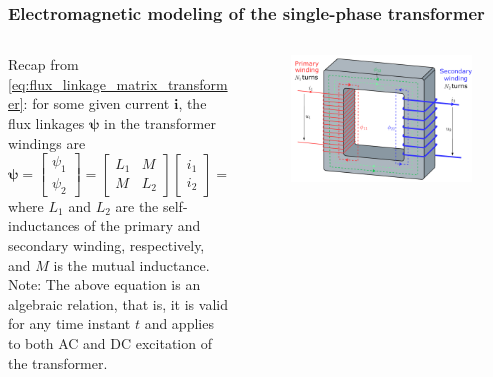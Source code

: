 \begin{frame}
	\frametitle{Electromagnetic modeling of the single-phase transformer}
    \begin{columns}
		\begin{column}{0.45\textwidth}
            Recap from \eqref{eq:flux_linkage_matrix_transformer}: for some given current $\bm{i}$, the flux linkages $\bm{\psi}$ in the transformer windings are
			\begin{equation*}
				\bm{\psi} = \begin{bmatrix} \psi_1 \\ \psi_2 \end{bmatrix} = \begin{bmatrix} L_1 & M \\ M & L_2 \end{bmatrix} \begin{bmatrix} i_1 \\ i_2 \end{bmatrix} = \bm{L}\bm{i}
			\end{equation*}
			where $L_1$ and $L_2$ are the self-inductances of the primary and secondary winding, respectively, and $M$ is the mutual inductance.
			\\[1em] \pause
			Note: The above equation is an algebraic relation, that is, it is valid for any time instant $t$ and applies to both AC and DC excitation of the transformer. 
		\end{column}
        \hfill
		\begin{column}{0.525\textwidth}
			\onslide<1->
			\begin{figure}
				\centering
				\includegraphics[height=0.575\textheight]{fig/lec02/Transformer3d_col3.pdf}
			\end{figure}
		\end{column}
		\end{columns}
\end{frame}

